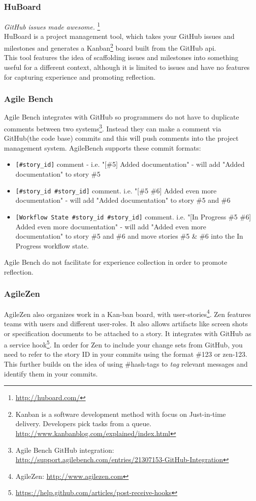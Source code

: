 \subsubsection*{HuBoard}
\emph{GitHub issues made awesome.} \footnote{\url{http://huboard.com/}} \\
HuBoard is a project management tool, which takes your GitHub issues and milestones and generates a Kanban\footnote{Kanban is a software development method with focus on Just-in-time delivery. Developers pick tasks from a queue. \url{http://www.kanbanblog.com/explained/index.html}} board built from the GitHub api. \\
This tool features the idea of scaffolding issues and milestones into something useful for a different context, although it is limited to issues and have no features for capturing experience and promoting reflection. 
\subsubsection*{Agile Bench}
Agile Bench integrates with GitHub so programmers do not have to duplicate comments between two systems\footnote{Agile Bench GitHub integration: \url{http://support.agilebench.com/entries/21307153-GitHub-Integration}}. Instead they can make a comment via GitHub(the code base) commits and this will push comments into the project management system. AgileBench supports these commit formats:
\begin{itemize}
\item \verb|[#story_id]| comment - i.e. "[\#5] Added documentation" - will add "Added documentation" to story \#5
\item \verb|[#story_id #story_id]| comment. i.e. "[\#5 \#6] Added even more documentation" - will add "Added documentation" to story \#5 and \#6
\item \verb|[Workflow State #story_id #story_id]| comment. i.e. "[In Progress \#5 \#6] Added even more documentation" - will add "Added even more documentation" to story \#5 and \#6 and move stories \#5 \& \#6 into the In Progress workflow state.
\end{itemize}
Agile Bench do not facilitate for experience collection in order to promote reflection.
\subsubsection*{AgileZen}
AgileZen also organizes work in a Kan-ban board, with user-stories\footnote{AgileZen: \url{http://www.agilezen.com}}. Zen features teams with users and different user-roles. It also allows artifacts like screen shots or specification documents to be attached to a story. It integrates with GitHub as a service hook\footnote{\url{https://help.github.com/articles/post-receive-hooks}}. In order for Zen to include your change sets from GitHub, you need to refer to the story ID in your commits using the format \#123 or zen-123. This further builds on the idea of using \#hash-tags to \textit{tag} relevant messages and identify them in your commits. 

